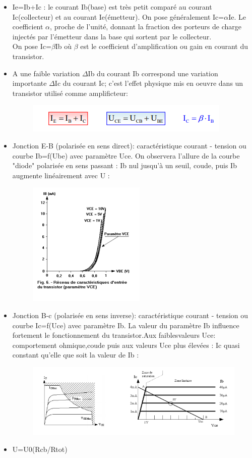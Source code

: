 \documentclass{report}
\begin{document}
\begin{itemize}
\item Ie=Ib+Ic : le courant Ib(base) est très petit comparé au courant Ic(collecteur) et au courant Ie(émetteur). On pose généralement  Ic=$\alpha$Ie. Le coefficient $\alpha$, proche de l'unité, donnant la fraction des porteurs de charge injectés par l'émetteur dans la base qui sortent par le collecteur.
\\On pose Ic=$\beta$Ib où $\beta$ est le coefficient d'amplification ou gain en courant du transistor.
\item A une faible variation $\Delta$Ib du courant Ib correspond une variation importante $\Delta$Ic du courant Ic; c'est l'effet physique mis en oeuvre dans un transistor utilisé comme amplificteur:
\begin{figure}[h!]
\centering
\includegraphics[scale=1]{Amp1.png}
\end{figure}
\newpage
\item Jonction E-B (polarisée en sens direct): caractéristique courant - tension ou courbe Ib=f(Ube) avec paramètre Uce. On observera l'allure de la courbe "diode" polarisée en sens passant : Ib nul jusqu'à un seuil, coude, puis Ib augmente linéairement avec U :
\begin{figure}[h!]
\centering
\includegraphics[scale=0.5]{Amp2.png}
\end{figure}
\item Jonction B-c (polarisée en sens inverse): caractéristique courant - tension ou courbe Ic=f(Uce) avec paramètre Ib. La valeur du paramètre Ib influence fortement le fonctionnement du transistor.Aux faiblesvaleurs Uce: comportement ohmique,coude puis aux valeurs Uce plus élevées : Ic quasi constant qu'elle que soit la valeur de Ib :
\begin{figure}[h!]
\centering
\includegraphics[scale=0.5]{Amp3.png}
\end{figure}
\item U=U0(Rcb/Rtot)
\end{itemize}
\end{document}
